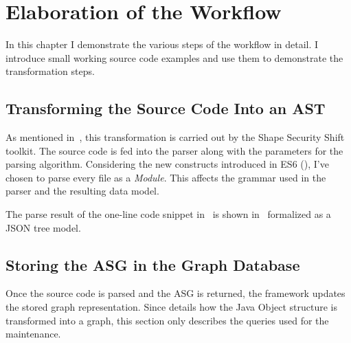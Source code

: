 \chapter{Elaboration of the Workflow}
\label{chap:elaboration-of-the-workflow}

In this chapter I demonstrate the various steps of the workflow in detail. I introduce small working source code examples and use them to demonstrate the transformation steps.

\section{Transforming the Source Code Into an AST}
As mentioned in~, this transformation is carried out by the Shape Security Shift toolkit. The source code is fed into the parser along with the parameters for the parsing algorithm. Considering the new constructs introduced in ES6 (), I've chosen to parse every file as a \emph{Module}. This affects the grammar used in the parser and the resulting data model.

The parse result of the one-line code snippet in~ is shown in~ formalized as a JSON tree model. %

\begin{figure}[!htb]
	\begin{minipage}{\textwidth}
		
	\end{minipage}
\end{figure}

\begin{figure}[!htb]
	\begin{minipage}{\textwidth}
		
	\end{minipage}
\end{figure}


\section{Storing the ASG in the Graph Database}
Once the source code is parsed and the ASG is returned, the framework updates the stored graph representation. Since  details how the Java Object structure is transformed into a graph, this section only describes the queries used for the maintenance.

